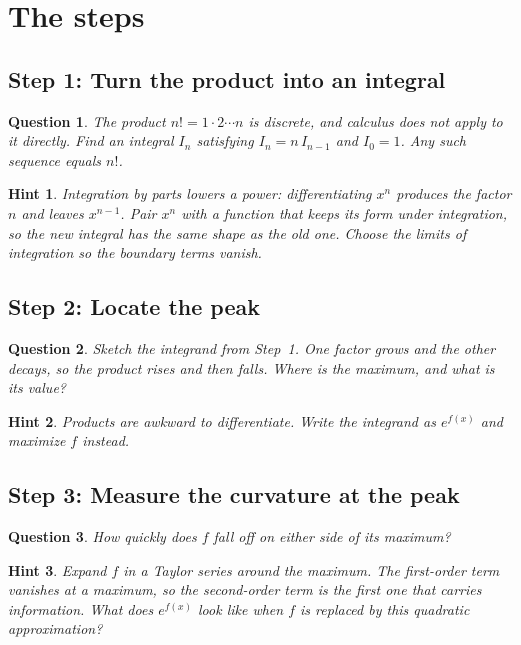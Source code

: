 \documentclass{workbook}
\theoremstyle{step}
\newtheorem*{question}{Question}
\newtheorem*{hint}{Hint}
\begin{document}
\section{The steps}

\subsection*{Step 1: Turn the product into an integral}

\begin{question}
The product $n! = 1\cdot 2\cdots n$ is discrete, and calculus does not apply
to it directly. Find an integral $I_n$ satisfying $I_n = n\,I_{n-1}$ and
$I_0 = 1$. Any such sequence equals $n!$.
\end{question}

\begin{hint}
Integration by parts lowers a power: differentiating $x^n$ produces the
factor $n$ and leaves $x^{n-1}$. Pair $x^n$ with a function that keeps its
form under integration, so the new integral has the same shape as the old
one. Choose the limits of integration so the boundary terms vanish.
\end{hint}

\subsection*{Step 2: Locate the peak}

\begin{question}
Sketch the integrand from Step~1. One factor grows and the other decays, so
the product rises and then falls. Where is the maximum, and what is its
value?
\end{question}

\begin{hint}
Products are awkward to differentiate. Write the integrand as $e^{f(x)}$ and
maximize $f$ instead.
\end{hint}

\subsection*{Step 3: Measure the curvature at the peak}

\begin{question}
How quickly does $f$ fall off on either side of its maximum?
\end{question}

\begin{hint}
Expand $f$ in a Taylor series around the maximum. The first-order term
vanishes at a maximum, so the second-order term is the first one that
carries information. What does $e^{f(x)}$ look like when $f$ is replaced by
this quadratic approximation?
\end{hint}
\end{document}
